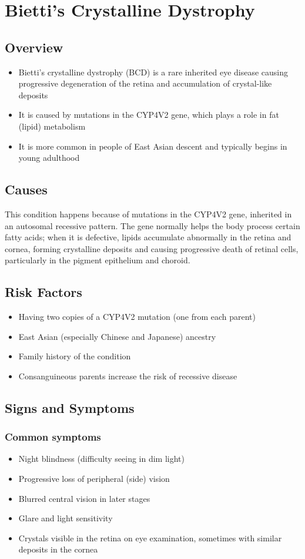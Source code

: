 \chapter{Bietti's Crystalline Dystrophy}
\label{sec:Bietti's Crystalline Dystrophy}

\section{Overview}
\begin{itemize}[noitemsep]
  \item Bietti's crystalline dystrophy (BCD) is a rare inherited eye disease causing progressive degeneration of the retina and accumulation of crystal-like deposits
  \item It is caused by mutations in the CYP4V2 gene, which plays a role in fat (lipid) metabolism
  \item It is more common in people of East Asian descent and typically begins in young adulthood
\end{itemize}
\section{Causes}
This condition happens because of mutations in the CYP4V2 gene, inherited in an autosomal recessive pattern. The gene normally helps the body process certain fatty acids; when it is defective, lipids accumulate abnormally in the retina and cornea, forming crystalline deposits and causing progressive death of retinal cells, particularly in the pigment epithelium and choroid.
\section{Risk Factors}
\begin{itemize}[noitemsep]
  \item Having two copies of a CYP4V2 mutation (one from each parent)
  \item East Asian (especially Chinese and Japanese) ancestry
  \item Family history of the condition
  \item Consanguineous parents increase the risk of recessive disease
\end{itemize}
\section{Signs and Symptoms}
\subsection{Common symptoms}
\begin{itemize}[noitemsep]
  \item Night blindness (difficulty seeing in dim light)
  \item Progressive loss of peripheral (side) vision
  \item Blurred central vision in later stages
  \item Glare and light sensitivity
  \item Crystals visible in the retina on eye examination, sometimes with similar deposits in the cornea
\end{itemize}
